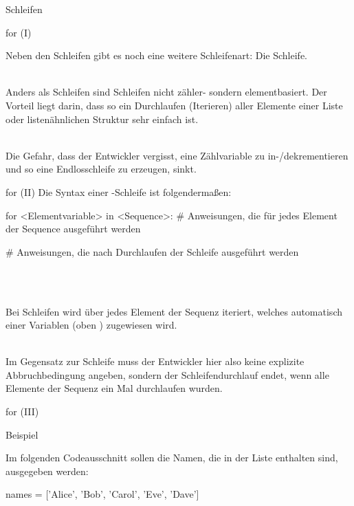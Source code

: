 \begin{subsection}{Schleifen}
        \begin{frame}{for (I)}
        
            Neben den  Schleifen gibt es noch eine weitere Schleifenart: Die  Schleife. \\~\
            
            Anders als  Schleifen sind  Schleifen nicht zähler- sondern elementbasiert. Der Vorteil liegt darin, dass so ein Durchlaufen (Iterieren) aller Elemente einer Liste oder listenähnlichen Struktur sehr einfach ist. \\~\
            
            Die Gefahr, dass der Entwickler vergisst, eine Zählvariable zu in-/dekrementieren und so eine Endlosschleife zu erzeugen, sinkt.
            
        \end{frame}
        
        
        \begin{frame}[fragile]{for (II)}
            Die Syntax einer -Schleife ist folgendermaßen:
            
\begin{pythoncode}
for <Elementvariable> in <Sequence>:
    # Anweisungen, die für jedes Element der Sequence ausgeführt werden

# Anweisungen, die nach Durchlaufen der Schleife ausgeführt werden
\end{pythoncode} \\~\

            Bei  Schleifen wird über jedes Element der Sequenz iteriert, welches automatisch einer Variablen (oben ) zugewiesen wird.\\~\
            
            Im Gegensatz zur  Schleife muss der Entwickler hier also keine explizite Abbruchbedingung angeben, sondern der Schleifendurchlauf endet, wenn alle Elemente der Sequenz ein Mal durchlaufen wurden.
        \end{frame}
        
        \begin{frame}[fragile]{for (III)}
            \begin{exampleblock}{Beispiel}
            
            Im folgenden Codeausschnitt sollen die Namen, die in der Liste enthalten sind, ausgegeben werden:
            
\begin{pythoncode}
names = ['Alice', 'Bob', 'Carol', 'Eve', 'Dave']


\end{pythoncode}
\end{exampleblock}
\end{frame}
\end{subsection}
